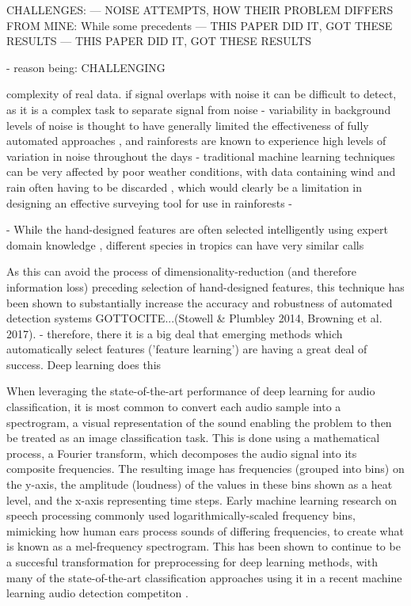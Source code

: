 \documentclass[11pt]{article}
\begin{document}
CHALLENGES:
--- NOISE
ATTEMPTS, HOW THEIR PROBLEM DIFFERS FROM MINE:
While some precedents 
--- THIS PAPER DID IT, GOT THESE RESULTS
--- THIS PAPER DID IT, GOT THESE RESULTS

- reason being: CHALLENGING

complexity of real data. if signal overlaps with noise it can be difficult to detect, as it is a complex task to separate signal from noise \citep{ovaskainen2018animal}
- variability in background levels of noise is thought to have generally limited the effectiveness of fully automated approaches \citep{heinicke2015assessing}, and rainforests are known to experience high levels of variation in noise throughout the days \citep{waser1977experimental}
- traditional machine learning techniques can be very affected by poor weather conditions, with data containing wind and rain often having to be discarded \citep{stowell2018automatic}, which would clearly be a limitation in designing an effective surveying tool for use in rainforests
-   

- While the hand-designed features are often selected intelligently using expert domain knowledge \citep{humphrey2013feature}, different species in tropics can have very similar calls \citep{zamora2016acoustic}


As this can avoid the process of dimensionality-reduction (and therefore information loss) preceding selection of hand-designed features, this technique has been shown to substantially increase the accuracy and robustness of automated detection systems GOTTOCITE...(Stowell \& Plumbley 2014, Browning et al. 2017).
- therefore, there it is a big deal that emerging methods which automatically select features ('feature learning') are having a great deal of success. Deep learning does this

When leveraging the state-of-the-art performance of deep learning for audio classification, it is most common to convert each audio sample into a spectrogram, a visual representation of the sound enabling the problem to then be treated as an image classification task. This is done using a mathematical process, a Fourier transform, which decomposes the audio signal into its composite frequencies. The resulting image has frequencies (grouped into bins) on the y-axis, the amplitude (loudness) of the values in these bins shown as a heat level, and the x-axis representing time steps. Early machine learning research on speech processing commonly used logarithmically-scaled frequency bins, mimicking how human ears process sounds of differing frequencies, to create what is known as a mel-frequency spectrogram. This has been shown to continue to be a succesful transformation for preprocessing for deep learning methods, with many of the state-of-the-art classification approaches using it in a recent machine learning audio detection competiton \citep{stowell2018automatic}.
\end{document}
